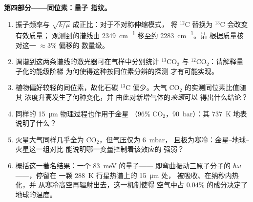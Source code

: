 \begin{problem}
\medskip\noindent\textbf{第四部分——同位素：量子
指纹。}
\begin{enumerate}[resume]
  \item 振子频率与 $\sqrt{k/\mu}$ 成正比：对于不对称伸缩模式，
        将 $^{12}$C 替换为 $^{13}$C 会改变有效质量；
        观测到的谱线由
        \qty{2349}{cm^{-1}} 移至约 \qty{2283}{cm^{-1}}。请
        根据质量核对这一 $\approx 3\%$ 偏移的
        数量级。
  \item 调谐到这两条谱线的激光器可在气样中分别统计 $^{13}$CO$_2$ 与
        $^{12}$CO$_2$：请解释量子化的能级阶梯
        为何使得这种按同位素分辨的探测
        才有可能实现。
  \item 植物偏好较轻的同位素，故化石碳
        $^{13}$C 偏少。大气 CO$_2$ 的实测同位素比值随其
        浓度升高发生了何种变化，并
        由此对新增气体的\emph{来源}可以
        得出什么结论？
  \item 同样的 \qty{15}{\micro m} 物理过程也作用于金星
        （$96\%$ CO$_2$，\qty{90}{bar}）：其
        \qty{737}{K} 地表说明了什么？
  \item 火星大气同样几乎全为 CO$_2$，但气压仅为 \qty{6}{mbar}，
        且极为寒冷：金星–地球–火星这一组对比
        能说明哪一变量控制着该效应的
        强弱？
  \item 概括这一著名结果：一个 \qty{83}{meV} 的量子——
        即弯曲振动三原子分子的 $\hbar\omega$——，停留在
        一颗 \qty{288}{K} 行星热谱上的 \qty{15}{\micro m} 处，
        被吸收、在纳秒内热化，并
        从寒冷高空再辐射出去，这一机制使得
        空气中占 $0.04\%$ 的成分决定了地球的温度。
\end{enumerate}
\end{problem}
